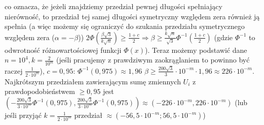 \documentclass{article}
\begin{document}
co oznacza, że jeżeli znajdziemy przedział pewnej długości spełniający nierówność, to przedział tej samej długości symetryczny względem zera również ją spełnia
(a więc możemy się ograniczyć do szukania przedziału symetrycznego względem zera ($\alpha=-\beta$))\newline
$2\Phi(\frac{\beta\sqrt{3}}{k\sqrt{n}})\ge\frac{1+c}{2}\Rightarrow \beta\ge \frac{k\sqrt{n}}{\sqrt{3}}\Phi^{-1}(\frac{1+c}{2})$ (gdzie $\Phi^{-1}$ to odwrotność różnowartościowej funkcji $\Phi(x)$).\newline
Teraz możemy podstawić dane $n=10^4,k=\frac{2}{10^m}$ (jeśli pracujemy z prawdziwym zaokrąglaniem to powinno być raczej $\frac{1}{2\cdot10^m}$), $c=0,95$: $\Phi^{-1}(0,975)\approx1,96$
$\beta\ge \frac{200\sqrt{3}}{3}\cdot 10^{-m}\cdot 1,96\approx 226\cdot10^{-m}$.\newline
Najkrótszym przedziałem zawierającym sumę zmiennych $U_i$ z prawdopodobieństwem $\ge0,95$ jest\newline
$(-\frac{200\sqrt{3}}{3\cdot10^m}\Phi^{-1}(0,975),\frac{200\sqrt{3}}{3\cdot10^m}\Phi^{-1}(0,975))\approx(-226\cdot10^{-m},226\cdot10^{-m})$\newline
(lub jeśli przyjąć $k=\frac{1}{2\cdot 10^m}$ przedział $\approx(-56,5\cdot10^{-m};56,5\cdot10^{-m})$)
\end{document}
